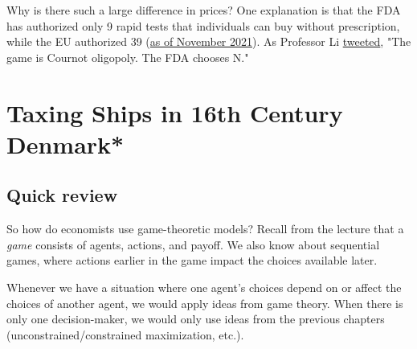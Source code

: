 Why is there such a large difference in prices? One explanation is that the FDA has authorized only 9 rapid tests that individuals can buy without prescription, while the EU authorized 39 (\href{https://www.propublica.org/article/heres-why-rapid-covid-tests-are-so-expensive-and-hard-to-find}{as of November 2021}). As Professor Li \href{https://twitter.com/ShengwuLi/status/1475179130715058176?s=20&t=BopM1Hz_TU8WDqCfqmM3mg}{tweeted}, "The game is Cournot oligopoly. The FDA chooses N."


%
%


\section{Taxing Ships in 16th Century Denmark*}
\subsection*{Quick review}
So how do economists use game-theoretic models? Recall from the lecture that a \textit{game} consists of agents, actions, and payoff. We also know about sequential games, where actions earlier in the game impact the choices available later. 

Whenever we have a situation where one agent's choices depend on or affect the choices of another agent, we would apply ideas from game theory. When there is only one decision-maker, we would only use ideas from the previous chapters (unconstrained/constrained maximization, etc.). 

